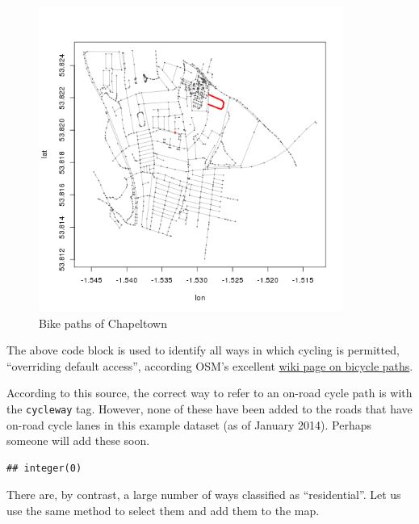 \documentclass[]{article}
\newenvironment{Shaded}{}{}
\newcommand{\KeywordTok}[1]{\textcolor[rgb]{0.00,0.44,0.13}{\textbf{{#1}}}}
\newcommand{\StringTok}[1]{\textcolor[rgb]{0.25,0.44,0.63}{{#1}}}
\newcommand{\NormalTok}[1]{{#1}}
\let\Oldincludegraphics\includegraphics
\renewcommand{\includegraphics}[1]{\Oldincludegraphics[width=10cm]{#1}}
\begin{document}
\begin{figure}[htbp]
\centering
\includegraphics{figure/Bike_paths_of_Chapeltown.png}
\caption{Bike paths of Chapeltown}
\end{figure}

The above code block is used to identify all ways in which cycling is
permitted, ``overriding default access'', according OSM's excellent
\href{http://wiki.openstreetmap.org/wiki/Bicycle}{wiki page on bicycle
paths}.

According to this source, the correct way to refer to an on-road cycle
path is with the \texttt{cycleway} tag. However, none of these have been
added to the roads that have on-road cycle lanes in this example dataset
(as of January 2014). Perhaps someone will add these soon.

\begin{Shaded}
\end{Shaded}

\begin{verbatim}
## integer(0)
\end{verbatim}

There are, by contrast, a large number of ways classified as
``residential''. Let us use the same method to select them and add them
to the map.
\end{document}
